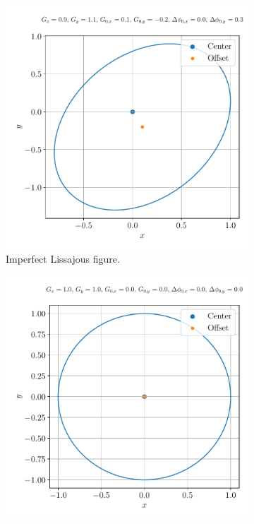 \documentclass{report}
\numberwithin{tm}{section}
\begin{document}
\begin{figure}[h]
	\centering
	\begin{subfigure}{0.49\textwidth}
		\centering
		\includegraphics[width=\textwidth]{figures/imperfect_liss.pdf}
		\caption{Imperfect Lissajous figure.}
		\label{fig:imperfect_liss}
	\end{subfigure}
	\hfill
	\begin{subfigure}{0.49\textwidth}
		\centering
		\includegraphics[width=\textwidth]{figures/perfect_liss.pdf}

\end{subfigure}
\end{figure}
\end{document}
